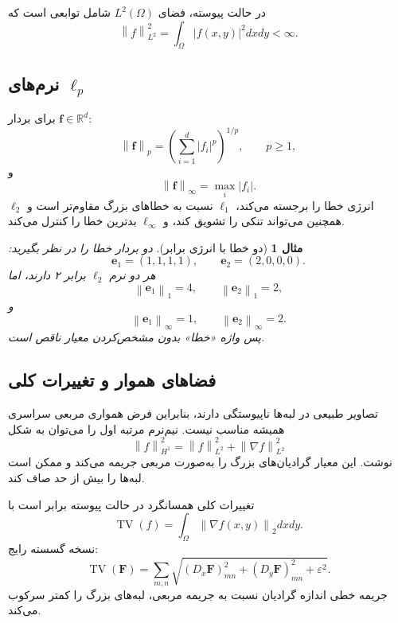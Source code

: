 \documentclass[12pt,openany,oneside]{book}
\newtheorem{example}{مثال}[chapter]
\newcommand{\R}{\mathbb{R}}
\newcommand{\norm}[1]{\left\lVert #1\right\rVert}
\newcommand{\abs}[1]{\left\lvert #1\right\rvert}
\newcommand{\vect}[1]{\bm{#1}}
\begin{document}
در حالت پیوسته، فضای \(L^2(\Omega)\) شامل توابعی است که
\begin{equation}
\norm{f}_{L^2}^2=\int_\Omega\abs{f(x,y)}^2dxdy<\infty.
\end{equation}

\subsection{نرم‌های \(\ell_p\)}

برای بردار \(\vect f\in\R^d\):
\begin{equation}
\norm{\vect f}_p=\left(\sum_{i=1}^d\abs{f_i}^p\right)^{1/p},\qquad p\ge1,
\end{equation}
و
\begin{equation}
\norm{\vect f}_\infty=\max_i\abs{f_i}.
\end{equation}
\(\ell_2\) انرژی خطا را برجسته می‌کند، \(\ell_1\) نسبت به خطاهای بزرگ مقاوم‌تر است و
همچنین می‌تواند تنکی را تشویق کند، و \(\ell_\infty\) بدترین خطا را کنترل می‌کند.

\begin{example}[دو خطا با انرژی برابر]
دو بردار خطا را در نظر بگیرید:
\begin{equation}
\vect e_1=(1,1,1,1),\qquad \vect e_2=(2,0,0,0).
\end{equation}
هر دو نرم \(\ell_2\) برابر ۲ دارند، اما
\begin{equation}
\norm{\vect e_1}_1=4,\qquad \norm{\vect e_2}_1=2,
\end{equation}
و
\begin{equation}
\norm{\vect e_1}_\infty=1,\qquad \norm{\vect e_2}_\infty=2.
\end{equation}
پس واژه «خطا» بدون مشخص‌کردن معیار ناقص است.
\end{example}

\subsection{فضاهای هموار و تغییرات کلی}

تصاویر طبیعی در لبه‌ها ناپیوستگی دارند، بنابراین فرض همواری مربعی سراسری همیشه مناسب نیست.
نیم‌نرم مرتبه اول را می‌توان به شکل
\begin{equation}
\norm{f}_{H^1}^2=\norm{f}_{L^2}^2+\norm{\nabla f}_{L^2}^2
\end{equation}
نوشت. این معیار گرادیان‌های بزرگ را به‌صورت مربعی جریمه می‌کند و ممکن است لبه‌ها را بیش از حد صاف کند.

تغییرات کلی همسانگرد در حالت پیوسته برابر است با
\begin{equation}
\operatorname{TV}(f)=\int_\Omega\norm{\nabla f(x,y)}_2dxdy.
\end{equation}
نسخه گسسته رایج:
\begin{equation}
\operatorname{TV}(\vect F)=\sum_{m,n}
\sqrt{(D_x\vect F)_{mn}^2+(D_y\vect F)_{mn}^2+\varepsilon^2}.
\end{equation}
جریمه خطی اندازه گرادیان نسبت به جریمه مربعی، لبه‌های بزرگ را کمتر سرکوب می‌کند.
\end{document}
